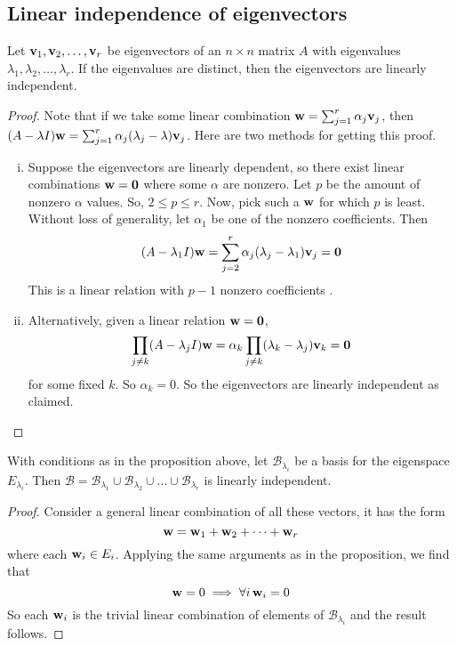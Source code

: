 \subsection{Linear independence of eigenvectors}
\begin{proposition}
	Let \(\vb v_1, \vb v_2, \dots, \vb v_r\) be eigenvectors of an \(n\times n\) matrix \(A\) with eigenvalues \(\lambda_1, \lambda_2,\dots,\lambda_r\).
	If the eigenvalues are distinct, then the eigenvectors are linearly independent.
\end{proposition}
\begin{proof}
	Note that if we take some linear combination \(\vb w = \sum_{j=1}^r \alpha_j\vb v_j\), then \((A - \lambda I)\vb w = \sum_{j=1}^r \alpha_j(\lambda_j - \lambda)\vb v_j\).
	Here are two methods for getting this proof.
	\begin{enumerate}[(i)]
		\item Suppose the eigenvectors are linearly dependent, so there exist linear combinations \(\vb w = \vb 0\) where some \(\alpha\) are nonzero.
		      Let \(p\) be the amount of nonzero \(\alpha\) values.
		      So, \(2 \leq p \leq r\).
		      Now, pick such a \(\vb w\) for which \(p\) is least.
		      Without loss of generality, let \(\alpha_1\) be one of the nonzero coefficients.
		      Then
		      \[
			      (A - \lambda_1 I)\vb w = \sum_{j=2}^r \alpha_j(\lambda_j - \lambda_1)\vb v_j = \vb 0
		      \]
		      This is a linear relation with \(p-1\) nonzero coefficients \contradiction.
		\item Alternatively, given a linear relation \(\vb w=\vb 0\),
		      \[
			      \prod_{j \neq k} (A - \lambda_j I) \vb w = \alpha_k \prod_{j \neq k} (\lambda_k - \lambda_j) \vb v_k = \vb 0
		      \]
		      for some fixed \(k\).
		      So \(\alpha_k = 0\).
		      So the eigenvectors are linearly independent as claimed.
	\end{enumerate}
\end{proof}
\begin{corollary}
	With conditions as in the proposition above, let \(\mathcal B_{\lambda_i}\) be a basis for the eigenspace \(E_{\lambda_i}\).
	Then \(\mathcal B = \mathcal B_{\lambda_1} \cup \mathcal B_{\lambda_2} \cup \dots \cup \mathcal B_{\lambda_r}\) is linearly independent.
\end{corollary}
\begin{proof}
	Consider a general linear combination of all these vectors, it has the form
	\[
		\vb w = \vb w_1 + \vb w_2 + \dots + \vb w_r
	\]
	where each \(\vb w_i \in E_i\).
	Applying the same arguments as in the proposition, we find that
	\[
		\vb w = 0 \implies \forall i\,\vb w_i = 0
	\]
	So each \(\vb w_i\) is the trivial linear combination of elements of \(\mathcal B_{\lambda_i}\) and the result follows.
\end{proof}
